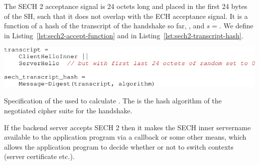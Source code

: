 The \ac{SECH} 2 acceptance signal is 24 octets long and placed in the first 24 bytes of the \ac{SH},
such that it does not overlap with the \ac{ECH} acceptance signal.
It is a function of a hash of the transcript of the handshake so far, \varsechtranscripthash{},
and $s=$\varsechlongtermkey{}.
We define \varsechacceptconfirmation{} in Listing~\ref{lst:sech2-accept-function} and \varsechtranscripthash{} in Listing~\ref{lst:sech2-transcript-hash}.

\begin{listing}[H]
\centering
\includegraphics[width=\linewidth]{figure/sech2-transcript-hash.pdf}
\captionsetup{width=.8\linewidth} 
\caption[SECH 2 Transcript Hash]{Specification of the  used to calculate . The  is the hash algorithm of the negotiated cipher suite for the handshake.}
\label{lst:sech2-transcript-hash}
\end{listing}



If the backend server accepts SECH 2 then it makes the SECH inner servername available to the application program via a callback or some other means, which allows the application program to decide whether or not to switch contexts (server certificate etc.).

